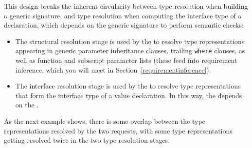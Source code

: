 \documentclass[../generics]{subfiles}
\begin{document}
This design breaks the inherent circularity between type resolution when building a generic signature, and type resolution when computing the interface type of a declaration, which depends on the generic signature to perform semantic checks:
\begin{itemize}
\item The structural resolution stage is used by the  to resolve type representations appearing in generic parameter inheritance clauses, trailing \texttt{where} clauses, as well as function and subscript parameter lists (these feed into requirement inference, which you will meet in Section~\ref{requirementinference}).

\item The interface resolution stage is used by the  to resolve type representations that form the interface type of a value declaration. In this way, the  depends on the .
\end{itemize}
As the next example shows, there is some overlap between the type representations resolved by the two requests, with some type representations getting resolved twice in the two type resolution stages.
\end{document}
